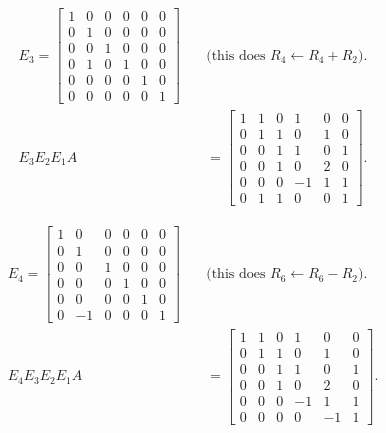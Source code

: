 \documentclass[11pt]{article}
\begin{document}
{%
\begin{align*}
E_3=
\left[
\begin{array}{rrrrrr}
 1& 0& 0& 0& 0& 0\\
 0& 1& 0& 0& 0& 0\\
 0& 0& 1& 0& 0& 0\\
 0& 1& 0& 1& 0& 0\\
 0& 0& 0& 0& 1& 0\\
 0& 0& 0& 0& 0& 1
\end{array}
\right]
\quad&\text{(this does }R_4\leftarrow R_4+R_2\text{)}.\\
E_3E_2E_1A
&=
\left[
\begin{array}{rrrrrr}
 1& 1& 0& 1& 0& 0\\
 0& 1& 1& 0& 1& 0\\
 0& 0& 1& 1& 0& 1\\
 0& 0& 1& 0& 2& 0\\
 0& 0& 0&-1& 1& 1\\
 0& 1& 1& 0& 0& 1
\end{array}
\right].
\end{align*}

\begin{align*}
E_4=
\left[
\begin{array}{rrrrrr}
 1& 0& 0& 0& 0& 0\\
 0& 1& 0& 0& 0& 0\\
 0& 0& 1& 0& 0& 0\\
 0& 0& 0& 1& 0& 0\\
 0& 0& 0& 0& 1& 0\\
 0&-1& 0& 0& 0& 1
\end{array}
\right]
\quad&\text{(this does }R_6\leftarrow R_6-R_2\text{)}.\\
E_4E_3E_2E_1A
&=
\left[
\begin{array}{rrrrrr}
 1& 1& 0& 1& 0& 0\\
 0& 1& 1& 0& 1& 0\\
 0& 0& 1& 1& 0& 1\\
 0& 0& 1& 0& 2& 0\\
 0& 0& 0&-1& 1& 1\\
 0& 0& 0& 0&-1& 1
\end{array}
\right].
\end{align*}

}
\end{document}
